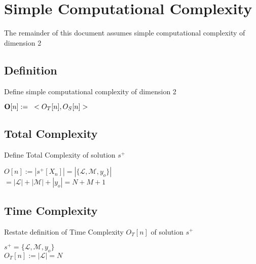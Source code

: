\documentclass[11pt]{article}
\begin{document}





















\newpage
\section{Simple Computational Complexity}
The remainder of this document assumes simple computational complexity of dimension 2

\subsection{Definition}
Define simple computational complexity of dimension 2
\begin{center}
$
\bold{O}[n] := \hspace{3mm} < O_T [n], O_S [n] >
$
\end{center}




\subsection{Total Complexity}
Define Total Complexity of solution $s^+$
\begin{center}
$O[n] :=  |s^+[X_n]| = |\{\mathcal{L},\mathcal{M},y_o\}|$
\\ \vspace{4mm}
$
= |\mathcal{L}| + |\mathcal{M}| + |y_o| = N + M + 1
$
\end{center}






\subsection{Time Complexity}
Restate definition of Time Complexity $O_T[n]$ of solution $s^+$
\begin{center}
$
s^+ = \{ \mathcal{L},\mathcal{M},y_o\}
$
\\ \vspace{3mm}
$
O_T[n] := |\mathcal{L}| = N
$
\end{center}
\end{document}
